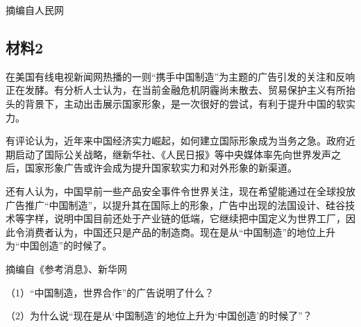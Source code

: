 \documentclass[UTF8,11pt]{ctexart}
\begin{document}
摘编自人民网

\subsection*{材料2}

在美国有线电视新闻网热播的一则“携手中国制造”为主题的广告引发的关注和反响正在发酵。有分析人士认为，在当前金融危机阴霾尚未散去、贸易保护主义有所抬头的背景下，主动出击展示国家形象，是一次很好的尝试，有利于提升中国的软实力。

有评论认为，近年来中国经济实力崛起，如何建立国际形象成为当务之急。政府近期启动了国际公关战略，继新华社、《人民日报》等中央媒体率先向世界发声之后，国家形象广告或许会成为提升国家软实力和对外形象的新渠道。

还有人认为，中国早前一些产品安全事件令世界关注，现在希望能通过在全球投放广告推广“中国制造”，以提升其在国际上的形象，广告中出现的法国设计、硅谷技术等字样，说明中国目前还处于产业链的低端，它继续把中国定义为世界工厂，因此令消费者认为，中国还只是产品的制造商。现在是从“中国制造”的地位上升为“中国创造”的时候了。

摘编自《参考消息》、新华网

（1）“中国制造，世界合作”的广告说明了什么？


（2）为什么说“现在是从‘中国制造’的地位上升为‘中国创造’的时候了”？
\end{document}
